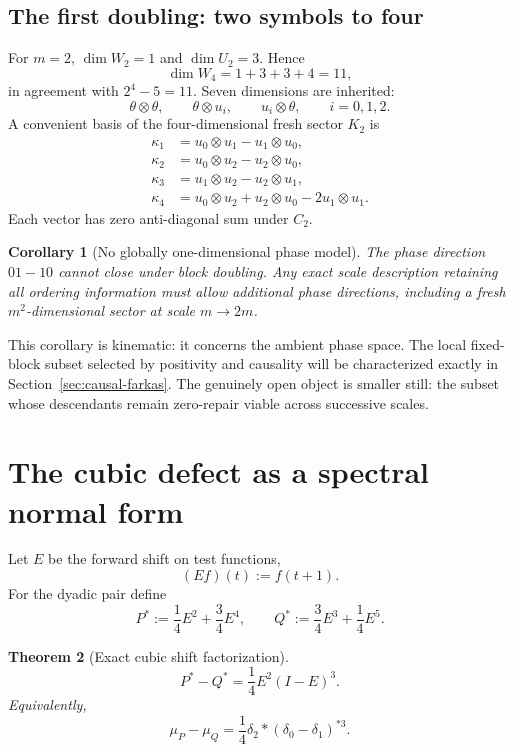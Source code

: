 \documentclass[11pt,a4paper]{article}
\newtheorem{theorem}{Theorem}[section]
\newtheorem{corollary}[theorem]{Corollary}
\theoremstyle{definition}
\theoremstyle{remark}
\begin{document}
\subsection{The first doubling: two symbols to four}

For \(m=2\), \(\dim W_2=1\) and \(\dim U_2=3\).  Hence
\[
 \dim W_4=1+3+3+4=11,
\]
in agreement with \(2^4-5=11\).  Seven dimensions are inherited:
\[
 \theta\otimes\theta,
 \qquad
 \theta\otimes u_i,
 \qquad
 u_i\otimes\theta,
 \qquad i=0,1,2.
\]
A convenient basis of the four-dimensional fresh sector \(K_2\) is
\begin{align*}
\kappa_1&=u_0\otimes u_1-u_1\otimes u_0,\\
\kappa_2&=u_0\otimes u_2-u_2\otimes u_0,\\
\kappa_3&=u_1\otimes u_2-u_2\otimes u_1,\\
\kappa_4&=u_0\otimes u_2+u_2\otimes u_0-2u_1\otimes u_1.
\end{align*}
Each vector has zero anti-diagonal sum under \(C_2\).

\begin{corollary}[No globally one-dimensional phase model]
The phase direction \(01-10\) cannot close under block doubling.  Any exact
scale description retaining all ordering information must allow additional
phase directions, including a fresh \(m^2\)-dimensional sector at scale
\(m\to2m\).
\end{corollary}

This corollary is kinematic: it concerns the ambient phase space.  The local
fixed-block subset selected by positivity and causality will be characterized
exactly in Section~\ref{sec:causal-farkas}.  The genuinely open object is
smaller still: the subset whose descendants remain zero-repair viable across
successive scales.

\section{The cubic defect as a spectral normal form}
\label{sec:cubic}

Let \(E\) be the forward shift on test functions,
\[
 (Ef)(t):=f(t+1).
\]
For the dyadic pair define
\[
 P^*:=\frac14E^2+\frac34E^4,
 \qquad
 Q^*:=\frac34E^3+\frac14E^5.
\]

\begin{theorem}[Exact cubic shift factorization]
\label{thm:cubicfactor}
\begin{equation}
 \boxed{
 P^*-Q^*=\frac14E^2(I-E)^3.
 }
 \label{eq:shiftfactor}
\end{equation}
Equivalently,
\begin{equation}
 \boxed{
 \mu_P-\mu_Q
 =\frac14\delta_2*(\delta_0-\delta_1)^{*3}.
 }
 \label{eq:measurefactor}
\end{equation}
\end{theorem}
\end{document}
